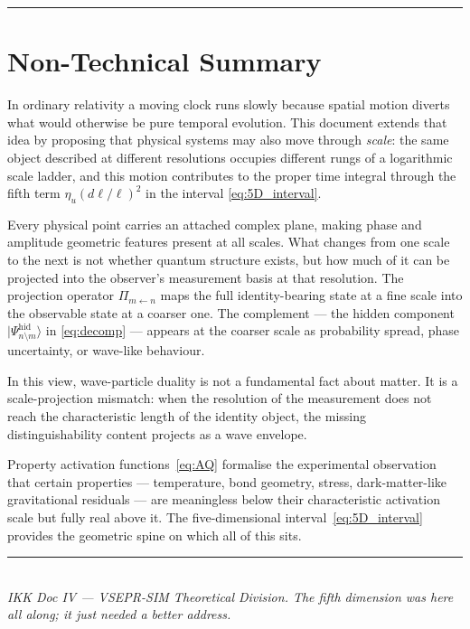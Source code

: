 \documentclass[11pt, a4paper, oneside]{article}
\theoremstyle{definition}
\theoremstyle{plain}
\theoremstyle{remark}
\newcommand{\Proj}[2]{\Pi_{#1 \leftarrow #2}}
\newcommand{\Psihid}{|\Psi^{\mathrm{hid}}_{n \setminus m}\rangle}
\begin{document}
\noindent\rule{\linewidth}{0.4pt}

\section{Non-Technical Summary}
\label{sec:summary}

In ordinary relativity a moving clock runs slowly because spatial motion
diverts what would otherwise be pure temporal evolution.
This document extends that idea by proposing that physical systems
may also move through \emph{scale}: the same object described at
different resolutions occupies different rungs of a logarithmic
scale ladder, and this motion contributes to the proper time integral
through the fifth term $\eta_u(d\ell/\ell)^2$ in the interval
\eqref{eq:5D_interval}.

Every physical point carries an attached complex plane, making phase
and amplitude geometric features present at all scales.
What changes from one scale to the next is not whether quantum structure
exists, but how much of it can be projected into the observer's
measurement basis at that resolution.
The projection operator $\Proj{m}{n}$ maps the full identity-bearing
state at a fine scale into the observable state at a coarser one.
The complement --- the hidden component $\Psihid$ in \eqref{eq:decomp}
--- appears at the coarser scale as probability spread, phase uncertainty,
or wave-like behaviour.

In this view, wave-particle duality is not a fundamental fact about matter.
It is a scale-projection mismatch: when the resolution of the measurement
does not reach the characteristic length of the identity object, the
missing distinguishability content projects as a wave envelope.

Property activation functions~\eqref{eq:AQ} formalise the experimental
observation that certain properties --- temperature, bond geometry, stress,
dark-matter-like gravitational residuals --- are meaningless below their
characteristic activation scale but fully real above it.
The five-dimensional interval~\eqref{eq:5D_interval} provides the
geometric spine on which all of this sits.

\vfill
\begin{center}
  \rule{0.4\textwidth}{0.4pt}\\[0.5em]
  \textit{IKK Doc IV --- VSEPR-SIM Theoretical Division.
  The fifth dimension was here all along; it just needed a better address.}
\end{center}
\end{document}
